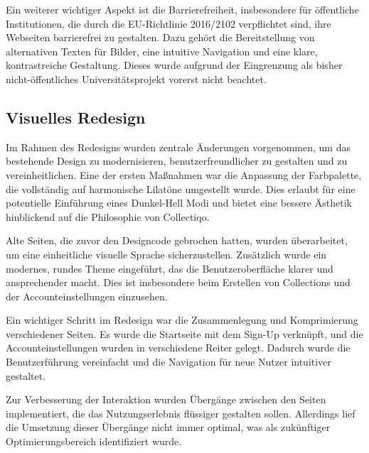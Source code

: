 Ein weiterer wichtiger Aspekt ist die Barrierefreiheit, insbesondere für öffentliche Institutionen, die durch die EU-Richtlinie 2016/2102 verpflichtet sind, ihre Webseiten barrierefrei zu gestalten.
Dazu gehört die Bereitstellung von alternativen Texten für Bilder, eine intuitive Navigation und eine klare, kontrastreiche Gestaltung.
Dieses wurde aufgrund der Eingrenzung als bisher nicht-öffentliches Universitätsprojekt vorerst nicht beachtet.


\parencite{GIDF.2024}

\subsection{Visuelles Redesign}\label{subsec:subsection-three-two}

Im Rahmen des Redesigns wurden zentrale Änderungen vorgenommen, um das bestehende Design zu modernisieren, benutzerfreundlicher zu gestalten und zu vereinheitlichen.
Eine der ersten Maßnahmen war die Anpassung der Farbpalette, die vollständig auf harmonische Lilatöne umgestellt wurde.
Dies erlaubt für eine potentielle Einführung eines Dunkel-Hell Modi und bietet eine bessere Ästhetik hinblickend auf die Philosophie von Collectiqo.

Alte Seiten, die zuvor den Designcode gebrochen hatten, wurden überarbeitet, um eine einheitliche visuelle Sprache sicherzustellen.
Zusätzlich wurde ein modernes, rundes Theme eingeführt, das die Benutzeroberfläche klarer und ansprechender macht.
Dies ist insbesondere beim Erstellen von Collections und der Accounteinstellungen einzusehen.

Ein wichtiger Schritt im Redesign war die Zusammenlegung und Komprimierung verschiedener Seiten.
Es wurde die Startseite mit dem Sign-Up verknüpft, und die Accounteinstellungen wurden in verschiedene Reiter gelegt.
Dadurch wurde die Benutzerführung vereinfacht und die Navigation für neue Nutzer intuitiver gestaltet.

Zur Verbesserung der Interaktion wurden Übergänge zwischen den Seiten implementiert, die das Nutzungserlebnis flüssiger gestalten sollen.
Allerdings lief die Umsetzung dieser Übergänge nicht immer optimal, was als zukünftiger Optimierungsbereich identifiziert wurde.